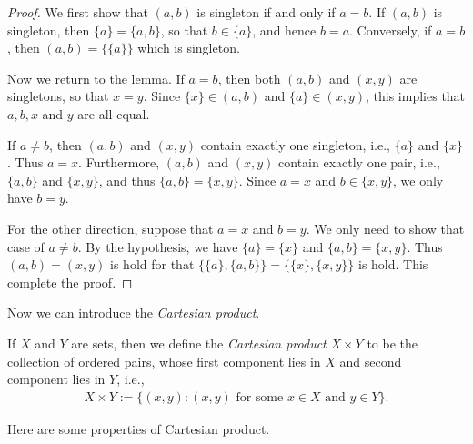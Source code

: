 \begin{proof}
    We first show that $(a, b)$ is singleton if and only if $a = b$. If $(a, b)$ is singleton, then $\{a\} = \{a, b\}$, so that $b \in \{a\}$, and hence $b = a$. Conversely, if $a = b$, then $(a, b) = \{\{a\}\}$ which is singleton.

    Now we return to the lemma. If $a = b$, then both $(a, b)$ and $(x, y)$ are singletons, so that $x = y$. Since $\{x\} \in (a, b)$ and $\{a\} \in (x, y)$, this implies that $a, b, x$ and $y$ are all equal.

    If $a \neq b$, then $(a, b)$ and $(x, y)$ contain exactly one singleton, i.e., $\{a\}$ and $\{x\}$. Thus $a = x$. Furthermore, $(a, b)$ and $(x, y)$ contain exactly one pair, i.e., $\{a, b\}$ and $\{x, y\}$, and thus $\{a, b\} = \{x, y\}$. Since $a = x$ and $b \in \{x, y\}$, we only have $b = y$.

    For the other direction, suppose that $a = x$ and $b = y$. We only need to show that case of $a \neq b$. By the hypothesis, we have $\{a\} = \{x\}$ and $\{a, b\} = \{x, y\}$. Thus $(a, b) = (x, y)$ is hold for that $\{\{a\}, \{a, b\}\} = \{\{x\}, \{x, y\}\}$ is hold. This complete the proof.
\end{proof}

Now we can introduce the \emph{Cartesian product}.

\begin{definition}
    If $X$ and $Y$ are sets, then we define the \emph{Cartesian product} $X \times Y$ to be the collection of ordered pairs, whose first component lies in $X$ and second component lies in $Y$, i.e.,
    \begin{align*}
        X \times Y := \{(x, y) : (x, y) \text{ for some }x \in X \text{ and } y \in Y\}.
    \end{align*}
\end{definition}

Here are some properties of Cartesian product.

